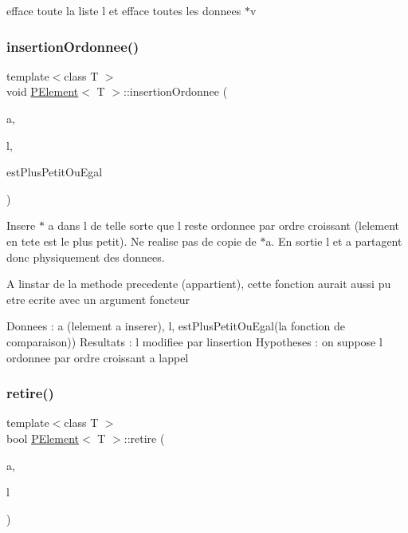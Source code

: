 efface toute la liste l et efface toutes les donnees $\ast$v \mbox{\label{class_p_element_a0e32256cbecaea72487f347763b38d57}} 
\subsubsection{\texorpdfstring{insertionOrdonnee()}{insertionOrdonnee()}}
{\footnotesize\ttfamily template$<$class T $>$ \\
void \mbox{\hyperlink{class_p_element}{P\+Element}}$<$ T $>$\+::insertion\+Ordonnee (\begin{DoxyParamCaption}\item[{T $\ast$}]{a,  }\item[{\mbox{\hyperlink{class_p_element}{P\+Element}}$<$ T $>$ $\ast$\&}]{l,  }\item[{bool($\ast$)(const T $\ast$a1, const T $\ast$a2)}]{est\+Plus\+Petit\+Ou\+Egal }\end{DoxyParamCaption})\hspace{0.3cm}{\ttfamily [static]}}

Insere $\ast$ a dans l de telle sorte que l reste ordonnee par ordre croissant (l\textquotesingle{}element en tete est le plus petit). Ne realise pas de copie de $\ast$a. En sortie l et a partagent donc physiquement des donnees.

A l\textquotesingle{}instar de la methode precedente (appartient), cette fonction aurait aussi pu etre ecrite avec un argument foncteur

Donnees \+: a (l\textquotesingle{}element a inserer), l, est\+Plus\+Petit\+Ou\+Egal(la fonction de comparaison)) Resultats \+: l modifiee par l\textquotesingle{}insertion Hypotheses \+: on suppose l ordonnee par ordre croissant a l\textquotesingle{}appel \mbox{\label{class_p_element_aa9bb67abf314148c1ecdb83e16c9c16d}} 
\subsubsection{\texorpdfstring{retire()}{retire()}}
{\footnotesize\ttfamily template$<$class T $>$ \\
bool \mbox{\hyperlink{class_p_element}{P\+Element}}$<$ T $>$\+::retire (\begin{DoxyParamCaption}\item[{const T $\ast$}]{a,  }\item[{\mbox{\hyperlink{class_p_element}{P\+Element}}$<$ T $>$ $\ast$\&}]{l }\end{DoxyParamCaption})\hspace{0.3cm}{\ttfamily [static]}}


